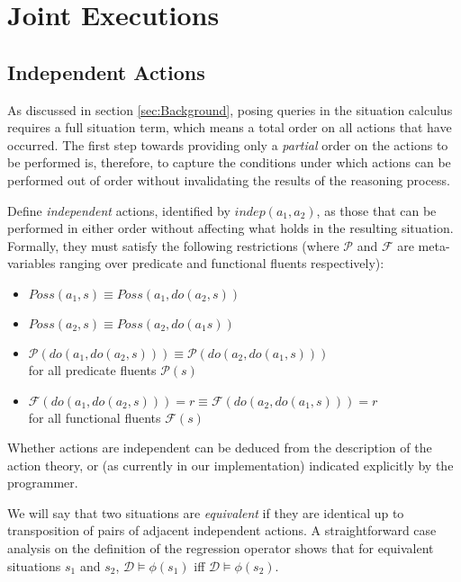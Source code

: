 \section{Joint Executions}

\label{sec:Joint-Execs}


\subsection{Independent Actions}

As discussed in section \ref{sec:Background}, posing queries in the
situation calculus requires a full situation term, which means a total
order on all actions that have occurred. The first step towards providing
only a \emph{partial} order on the actions to be performed is, therefore,
to capture the conditions under which actions can be performed out
of order without invalidating the results of the reasoning process.

Define \emph{independent} actions, identified by $indep(a_{1},a_{2})$,
as those that can be performed in either order without affecting what
holds in the resulting situation. Formally, they must satisfy the
following restrictions (where $\mathcal{P}$ and $\mathcal{F}$ are
meta-variables ranging over predicate and functional fluents respectively):

\begin{itemize}
\item $Poss(a_{1},s)\equiv Poss(a_{1},do(a_{2},s))$ 
\item $Poss(a_{2},s)\equiv Poss(a_{2},do(a_{1}s))$ 
\item $\mathcal{P}(do(a_{1},do(a_{2},s)))\equiv\mathcal{P}(do(a_{2},do(a_{1},s)))$\\
 for all predicate fluents $\mathcal{P}(s)$ 
\item $\mathcal{F}(do(a_{1},do(a_{2},s)))=r\equiv\mathcal{F}(do(a_{2},do(a_{1},s)))=r$\\
 for all functional fluents $\mathcal{F}(s)$ 
\end{itemize}
Whether actions are independent can be deduced from the description
of the action theory, or (as currently in our implementation) indicated
explicitly by the programmer.

We will say that two situations are \emph{equivalent} if they are
identical up to transposition of pairs of adjacent independent actions.
A straightforward case analysis on the definition of the regression
operator shows that for equivalent situations $s_{1}$ and $s_{2}$,
$\mathcal{D}\models\phi(s_{1})$ iff $\mathcal{D}\models\phi(s_{2})$.

